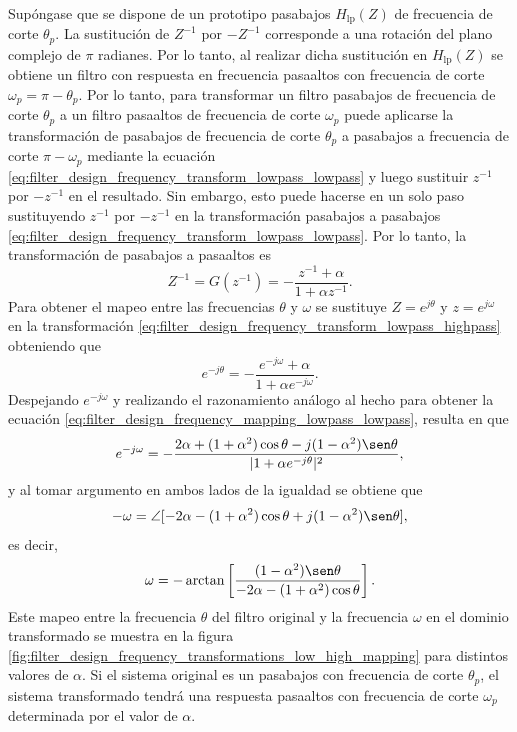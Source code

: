 \documentclass[a4paper]{report}
\begin{document}
Supóngase que se dispone de un prototipo pasabajos \(H_\textrm{lp}(Z)\) de frecuencia de corte \(\theta_p\). La sustitución de \(Z^{-1}\) por \(-Z^{-1}\) corresponde a una rotación del plano complejo de \(\pi\) radianes. Por lo tanto, al realizar dicha sustitución en \(H_\textrm{lp}(Z)\) se obtiene un filtro con respuesta en frecuencia pasaaltos con frecuencia de corte \(\omega_p=\pi-\theta_p\). Por lo tanto, para transformar un filtro pasabajos de frecuencia de corte \(\theta_p\) a un filtro pasaaltos de frecuencia de corte \(\omega_p\) puede aplicarse la transformación de pasabajos de frecuencia de corte \(\theta_p\) a pasabajos a frecuencia de corte \(\pi-\omega_p\) mediante la ecuación \ref{eq:filter_design_frequency_transform_lowpass_lowpass} y luego sustituir \(z^{-1}\) por \(-z^{-1}\) en el resultado. Sin embargo, esto puede hacerse en un solo paso sustituyendo \(z^{-1}\) por \(-z^{-1}\) en la transformación pasabajos a pasabajos \ref{eq:filter_design_frequency_transform_lowpass_lowpass}. Por lo tanto, la transformación de pasabajos a pasaaltos es
\begin{equation}\label{eq:filter_design_frequency_transform_lowpass_highpass}
 Z^{-1}=G(z^{-1})=-\frac{z^{-1}+\alpha}{1+\alpha z^{-1}}.
\end{equation}
Para obtener el mapeo entre las frecuencias \(\theta\) y \(\omega\) se sustituye \(Z=e^{j\theta}\) y \(z=e^{j\omega}\) en la transformación \ref{eq:filter_design_frequency_transform_lowpass_highpass} obteniendo que 
\begin{equation}\label{eq:filter_design_frequency_transform_unit_circle_lowpass_highpass}
 e^{-j\theta}=-\frac{e^{-j\omega}+\alpha}{1+\alpha e^{-j\omega}}. 
\end{equation}
Despejando \(e^{-j\omega}\) y realizando el razonamiento análogo al hecho para obtener la ecuación \ref{eq:filter_design_frequency_mapping_lowpass_lowpass}, resulta en que
\[
 e^{-j\omega}=-\frac{2\alpha+(1+\alpha^2)\cos\theta-j(1-\alpha^2)\sen\theta}{|1+\alpha e^{-j\theta}|^2},
\]
y al tomar argumento en ambos lados de la igualdad se obtiene que
\[
 -\omega=\angle[-2\alpha-(1+\alpha^2)\cos\theta+j(1-\alpha^2)\sen\theta], 
\]
es decir,
\begin{equation}\label{eq:filter_design_frequency_mapping_lowpass_highpass}
 \omega=-\arctan\left[\frac{(1-\alpha^2)\sen\theta}{-2\alpha-(1+\alpha^2)\cos\theta}\right].
\end{equation}
Este mapeo entre la frecuencia \(\theta\) del  filtro original y la frecuencia \(\omega\) en el dominio transformado se muestra en la figura \ref{fig:filter_design_frequency_transformations_low_high_mapping} para distintos valores de \(\alpha\). Si el sistema original es un pasabajos con frecuencia de corte \(\theta_p\), el sistema transformado tendrá una respuesta pasaaltos con frecuencia de corte \(\omega_p\) determinada por el valor de \(\alpha\).
\end{document}

